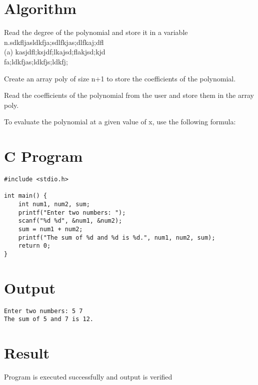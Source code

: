 

\section*{Algorithm}

\begin{algorithm}
    \item Read the degree of the polynomial and store it in a variable n.sdkfljasldkfja;sdlfkjas;dlfkaj;dfl\\
    (a) kasjdfl;ksjdf;lkajsd;flakjsd;kjd\\
    fa;ldkfjas;ldkfjs;ldkfj;
    \item Create an array poly of size n+1 to store the coefficients of the polynomial.
    \item Read the coefficients of the polynomial from the user and store them in the array poly.
    \item To evaluate the polynomial at a given value of x, use the following formula:
\end{algorithm}


\section*{C Program}

\begin{lstlisting}[label={list:first}]
#include <stdio.h>

int main() {
    int num1, num2, sum;
    printf("Enter two numbers: ");
    scanf("%d %d", &num1, &num2);
    sum = num1 + num2;
    printf("The sum of %d and %d is %d.", num1, num2, sum);
    return 0;
}
\end{lstlisting}


\section*{Output}

\begin{lstlisting}[label={list:output}]
Enter two numbers: 5 7
The sum of 5 and 7 is 12.
\end{lstlisting}


\section*{Result}
Program is executed successfully and output is verified